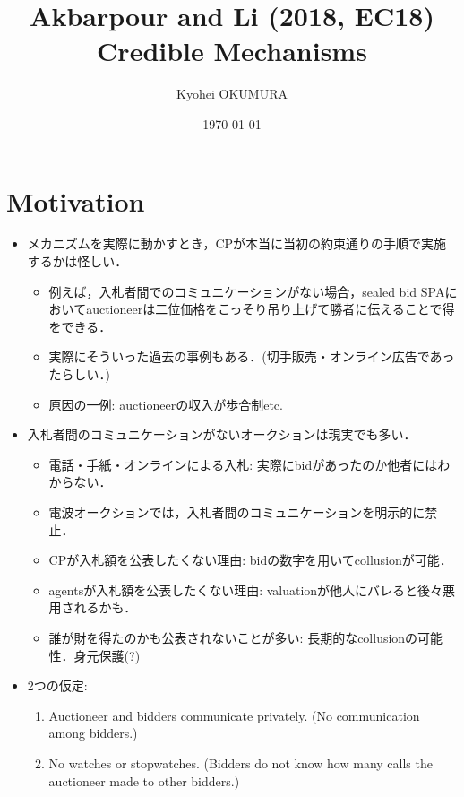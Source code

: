 \documentclass[11pt,a4paper,dvipdfmx]{article}
\theoremstyle{plain}
\newcommand{\1}{\mathbbm{1}}
\begin{document}
\title{Akbarpour and Li (2018, EC18) \\
Credible Mechanisms}
\author{Kyohei OKUMURA
}
\date{\today}
\maketitle


\section{Motivation}
\begin{itemize}
	\item メカニズムを実際に動かすとき，CPが本当に当初の約束通りの手順で実施するかは怪しい．
	\begin{itemize}
		\item 例えば，入札者間でのコミュニケーションがない場合，sealed bid SPAにおいてauctioneerは二位価格をこっそり吊り上げて勝者に伝えることで得をできる．
		\item 実際にそういった過去の事例もある．(切手販売・オンライン広告であったらしい．)
		\item 原因の一例: auctioneerの収入が歩合制etc.
	\end{itemize}
	\item 入札者間のコミュニケーションがないオークションは現実でも多い．
	\begin{itemize}
		\item 電話・手紙・オンラインによる入札: 実際にbidがあったのか他者にはわからない．
		\item 電波オークションでは，入札者間のコミュニケーションを明示的に禁止．
		\item CPが入札額を公表したくない理由: bidの数字を用いてcollusionが可能．
		\item agentsが入札額を公表したくない理由: valuationが他人にバレると後々悪用されるかも．
		\item 誰が財を得たのかも公表されないことが多い: 長期的なcollusionの可能性．身元保護(?)
	\end{itemize}
	\item 2つの仮定:
	\begin{enumerate}
		\item Auctioneer and bidders communicate privately. (No communication among bidders.)
		\item No watches or stopwatches. (Bidders do not know how many calls the auctioneer made to other bidders.)

\end{enumerate}
\end{itemize}
\end{document}
